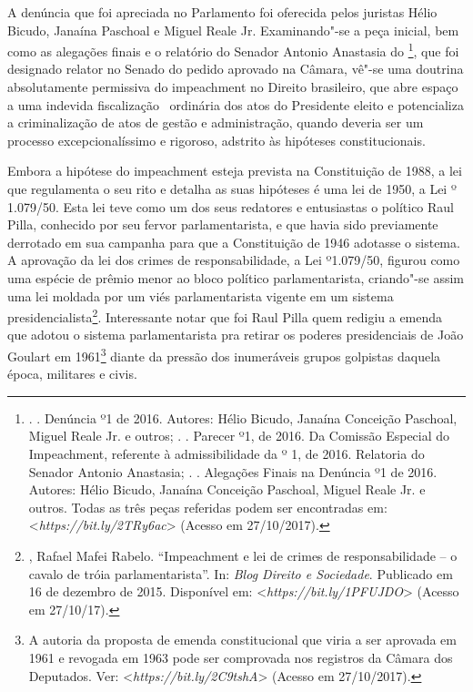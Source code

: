 A denúncia que foi apreciada no Parlamento foi oferecida pelos juristas
Hélio Bicudo, Janaína Paschoal e Miguel Reale Jr. Examinando"-se a peça
inicial, bem como as alegações finais e o relatório do Senador Antonio
Anastasia do \footnote{.   . Denúncia º1 de
  2016. Autores: Hélio Bicudo, Janaína Conceição Paschoal, Miguel Reale
  Jr. e outros; .  . Parecer º1, de 2016. Da Comissão
  Especial do Impeachment, referente à admissibilidade da  º 1, de
  2016. Relatoria do Senador Antonio Anastasia; .  .
  Alegações Finais na Denúncia º1 de 2016. Autores: Hélio Bicudo,
  Janaína Conceição Paschoal, Miguel Reale Jr. e outros. Todas as três
  peças referidas podem ser encontradas em:
  \textless{}\emph{https://bit.ly/2TRy6ac}\textgreater{}
  (Acesso em 27/10/2017).}, que foi designado relator no Senado do
pedido aprovado na Câmara, vê"-se uma doutrina absolutamente permissiva
do impeachment no Direito brasileiro, que abre espaço a uma indevida
fiscalização~ ordinária dos atos do Presidente eleito e potencializa a
criminalização de atos de gestão e administração, quando deveria ser um
processo excepcionalíssimo e rigoroso, adstrito às hipóteses
constitucionais.

Embora a hipótese do impeachment esteja prevista na Constituição de
1988, a lei que regulamenta o seu rito e detalha as suas hipóteses é uma
lei de 1950, a Lei º 1.079/50. Esta lei teve como um dos seus redatores
e entusiastas o político Raul Pilla, conhecido por seu fervor
parlamentarista, e que havia sido previamente derrotado em sua campanha
para que a Constituição de 1946 adotasse o sistema. A aprovação da lei
dos crimes de responsabilidade, a Lei º1.079/50, figurou como uma
espécie de prêmio menor ao bloco político parlamentarista, criando"-se
assim uma lei moldada por um viés parlamentarista vigente em um sistema
presidencialista\footnote{, Rafael Mafei Rabelo. ``Impeachment e
  lei de crimes de responsabilidade -- o cavalo de tróia parlamentarista''.
  In: \emph{Blog Direito e Sociedade}. Publicado em 16 de dezembro de 2015.
  Disponível em:
  \textless{}\emph{https://bit.ly/1PFUJDO}\textgreater{}
  (Acesso em 27/10/17).}. Interessante notar que foi Raul Pilla quem
redigiu a emenda que adotou o sistema parlamentarista pra retirar os
poderes presidenciais de João Goulart em 1961\footnote{A autoria da
  proposta de emenda constitucional que viria a ser aprovada em 1961 e
  revogada em 1963 pode ser comprovada nos registros da Câmara dos
  Deputados. Ver:
  \textless{}\emph{https://bit.ly/2C9tshA}\textgreater{}
  (Acesso em 27/10/2017).} diante da pressão dos inumeráveis grupos
golpistas daquela época, militares e civis.


